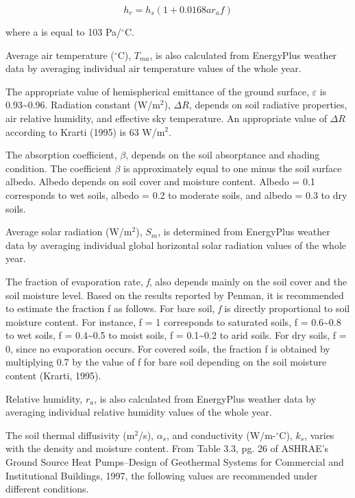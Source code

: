 \begin{equation}
{h_r} = {h_s}\left( {1 + 0.0168a{r_a}f} \right)
\end{equation}

where a is equal to 103 Pa/\(^{\circ}\)C.

Average air temperature (\(^{\circ}\)C), \(T_{ma}\), is also calculated from EnergyPlus weather data by averaging individual air temperature values of the whole year.

The appropriate value of hemispherical emittance of the ground surface, \({\varepsilon}\) is 0.93\textasciitilde{}0.96. Radiation constant (W/m\(^{2}\)), \({\Delta R}\), depends on soil radiative properties, air relative humidity, and effective sky temperature. An appropriate value of \({\Delta R}\) according to Krarti (1995) is 63 W/m\(^{2}\).

The absorption coefficient, \({\beta}\), depends on the soil absorptance and shading condition. The coefficient \({\beta}\) is approximately equal to one minus the soil surface albedo. Albedo depends on soil cover and moisture content. Albedo = 0.1 corresponds to wet soils, albedo = 0.2 to moderate soils, and albedo = 0.3 to dry soils.

Average solar radiation (W/m\(^{2}\)), \(S_{m}\), is determined from EnergyPlus weather data by averaging individual global horizontal solar radiation values of the whole year.

The fraction of evaporation rate, \emph{f}, also depends mainly on the soil cover and the soil moisture level. Based on the results reported by Penman, it is recommended to estimate the fraction f as follows. For bare soil, \emph{f} is directly proportional to soil moisture content. For instance, f = 1 corresponds to saturated soils, f = 0.6\textasciitilde{}0.8 to wet soils, f = 0.4\textasciitilde{}0.5 to moist soils, f = 0.1\textasciitilde{}0.2 to arid soils. For dry soils, f = 0, since no evaporation occurs. For covered soils, the fraction f is obtained by multiplying 0.7 by the value of f for bare soil depending on the soil moisture content (Krarti, 1995).

Relative humidity, \(r_{a}\), is also calculated from EnergyPlus weather data by averaging individual relative humidity values of the whole year.

The soil thermal diffusivity (m\(^{2}\)/s), \({\alpha_{s}}\), and conductivity (W/m-\(^{\circ}\)C), \(k_{s}\), varies with the density and moisture content. From Table 3.3, pg. 26 of ASHRAE's Ground Source Heat Pumps--Design of Geothermal Systems for Commercial and Institutional Buildings, 1997, the following values are recommended under different conditions.

